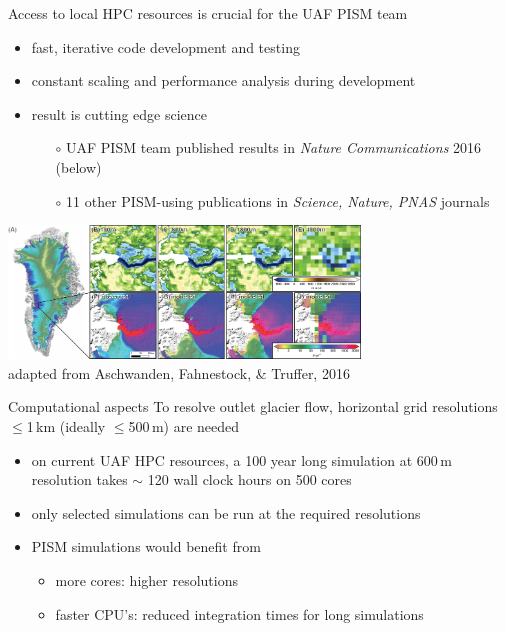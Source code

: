 \documentclass[hide notes,intlimits]{beamer}
\begin{document}
\begin{frame}{}
  \begin{block}{Access to local HPC resources is crucial for the UAF PISM team}
    \begin{itemize}
    \item fast, iterative code development and testing
    \item constant scaling and performance analysis during development
    \item result is cutting edge science
       \begin{itemize}
       \item[$\circ$] UAF PISM team published results in \emph{Nature Communications} 2016 (below)
       \item[$\circ$] 11 other PISM-using publications in \emph{Science, Nature, PNAS} journals
       \end{itemize}
    \end{itemize}
  \end{block}

\begin{center}
    \includegraphics[width=0.7\textwidth]{jakobshavn-beds}
    \\ \hfill \scriptsize adapted from Aschwanden, Fahnestock, \& Truffer, 2016
\end{center}
\end{frame}





\begin{frame}{Computational aspects}
  To resolve outlet glacier flow, horizontal grid resolutions $\le$1\,km (ideally $\le$500\,m) are needed
  \begin{itemize}
  \item on current UAF HPC resources, a 100 year long simulation at 600\,m resolution takes $\sim$ 120 wall clock hours on 500 cores
  \item only selected simulations can be run at the required resolutions
  \item PISM simulations would benefit from
    \begin{itemize}
    \item more cores: higher resolutions
  \item faster CPU's: reduced integration times for long simulations
  \end{itemize}
\end{itemize}
\end{frame}
\end{document}
